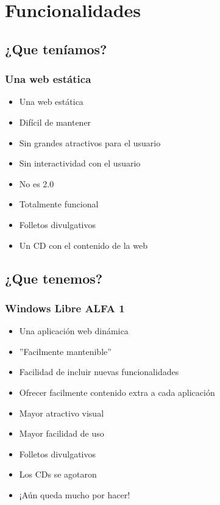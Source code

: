 \section{Funcionalidades}
	\subsection{¿Que teníamos?} %
	\begin{frame}
		\frametitle{Una web estática}
			\begin{itemize}
				\item <1-| alert@1> Una web estática
				\item <2-| alert@2> Difícil de mantener
				\item <3-| alert@3> Sin grandes atractivos para el usuario
				\item <4-| alert@4> Sin interactividad con el usuario
				\item <5-| alert@5> No es 2.0
				\item <6-| alert@6> Totalmente funcional
				\item <7-| alert@7> Folletos divulgativos
				\item <8-| alert@8> Un CD con el contenido de la web
			\end{itemize}

	\end{frame}

	\subsection{¿Que tenemos?} %
	\begin{frame}
		\frametitle{Windows Libre ALFA 1}
		\setbeamercovered{invisible}
		\begin{itemize}
			\item <1-| alert@1> Una aplicación web dinámica
			\item <2-| alert@2> ''Facilmente mantenible''
			\item <3-| alert@3> Facilidad de incluir nuevas funcionalidades
			\item <4-| alert@4> Ofrecer facilmente contenido extra a cada aplicación
			\item <5-| alert@5> Mayor atractivo visual
			\item <6-| alert@6> Mayor facilidad de uso
			\item <7-| alert@7> Folletos divulgativos
			\item <8-| alert@8> Los CDs se agotaron
			\item <9-| alert@9> ¡Aún queda mucho por hacer!
		\end{itemize}
	\end{frame}

